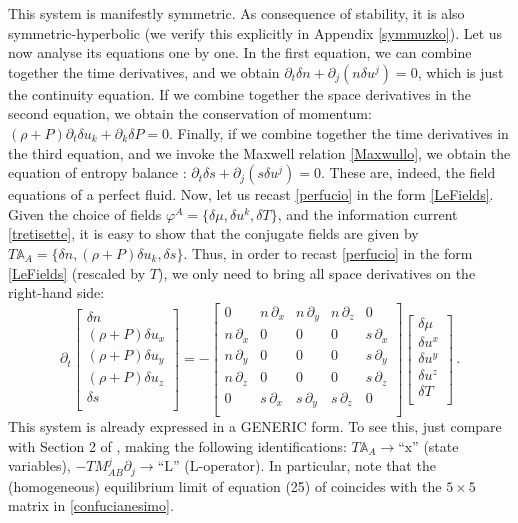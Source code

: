 \documentclass[a4paper, amsfonts, amssymb, amsmath, reprint, showkeys, nofootinbib, twoside, onecolumn,notitlepage]{revtex4-1}
\begin{document}
This system is manifestly symmetric. As consequence of stability, it is also symmetric-hyperbolic (we verify this explicitly in Appendix \ref{symmuzko}). Let us now analyse its equations one by one. In the first equation, we can combine together the time derivatives, and we obtain $\partial_t \delta n +\partial_j(n \delta u^j)=0$, which is just the continuity equation. If we combine together the space derivatives in the second equation, we obtain the conservation of momentum: $(\rho+P)\partial_t \delta u_k+\partial_k \delta P=0$. Finally, if we combine together the time derivatives in the third equation, and we invoke the Maxwell relation \eqref{Maxwullo}, we obtain the equation of entropy balance \cite{landau6}: $\partial_t \delta s+\partial_j (s\delta u^j)=0$. These are, indeed, the field equations of a perfect fluid. Now, let us recast \eqref{perfucio} in the form \eqref{LeFields}. Given the choice of fields $\varphi^A=\{ \delta \mu, \delta u^k, \delta T \}$, and the information current \eqref{tretisette}, it is easy to show that the conjugate fields are given by $T\mathbb{A}_A=\{\delta n, (\rho+P)\delta u_k , \delta s \}$. Thus, in order to recast \eqref{perfucio} in the form \eqref{LeFields} (rescaled by $T$), we only need to bring all space derivatives on the right-hand side:
\begin{equation}\label{confucianesimo}
\partial_t 
\begin{bmatrix}
\delta n \\[3pt]
(\rho+P)\delta u_x \\[3pt]
(\rho+P)\delta u_y \\[3pt]
(\rho+P)\delta u_z \\[3pt]
\delta s \\[3pt]
\end{bmatrix}
= -
\begin{bmatrix}
0 & n\, \partial_x & n\, \partial_y & n\, \partial_z & 0 \\[3pt]
n\, \partial_x & 0 & 0 & 0 & s\, \partial_x \\[3pt]
n\, \partial_y & 0 & 0 & 0 & s\, \partial_y \\[3pt]
n\, \partial_z & 0 & 0 & 0 & s\, \partial_z \\[3pt]
0 & s \, \partial_x & s\, \partial_y & s \, \partial_z & 0 \\[3pt]
\end{bmatrix}
\begin{bmatrix}
\delta \mu \\[3pt]
\delta u^x \\[3pt]
\delta u^y \\[3pt]
\delta u^z \\[3pt]
\delta T \\[3pt]
\end{bmatrix} \, .
\end{equation}
This system is already expressed in a GENERIC form. To see this, just compare with Section 2 of \citet{Otting1_1998}, making the following identifications: $T\mathbb{A}_A \rightarrow \text{``x''}$ (state variables), $-TM^{j}_{AB} \partial_j \rightarrow \text{``L''}$ (L-operator). In particular, note that the (homogeneous) equilibrium limit of equation (25) of \cite{Otting1_1998} coincides with the $5\times 5$ matrix in \eqref{confucianesimo}.
\end{document}
